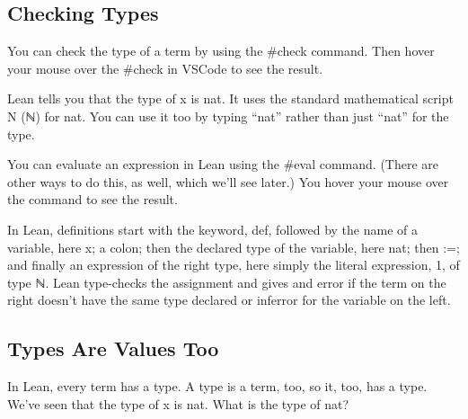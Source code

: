\documentclass[letterpaper,10pt,english]{sphinxmanual}
\begin{document}
\subsection{Checking Types}
\label{\detokenize{15-proofs:checking-types}}
You can check the type of a term by using the \#check command. Then
hover your mouse over the \#check in VSCode to see the result.

\begin{sphinxVerbatim}[commandchars=\\\{\}]
 
 
\end{sphinxVerbatim}

Lean tells you that the type of x is nat.  It uses the standard
mathematical script N (ℕ) for nat. You can use it too by typing “nat”
rather than just “nat” for the type.

\begin{sphinxVerbatim}[commandchars=\\\{\}]
    
\end{sphinxVerbatim}

You can evaluate an expression in Lean using the \#eval command. (There
are other ways to do this, as well, which we’ll see later.) You hover
your mouse over the command to see the result.

\begin{sphinxVerbatim}[commandchars=\\\{\}]
 
\end{sphinxVerbatim}

In Lean, definitions start with the keyword, def, followed by the name
of a variable, here x; a colon; then the declared type of the
variable, here nat; then :=; and finally an expression of the right
type, here simply the literal expression, 1, of type ℕ. Lean
type-checks the assignment and gives and error if the term on the
right doesn’t have the same type declared or inferror for the variable
on the left.


\subsection{Types Are Values Too}
\label{\detokenize{15-proofs:types-are-values-too}}
In Lean, every term has a type. A type is a term, too, so it, too, has
a type. We’ve seen that the type of x is nat. What is the type of nat?
\end{document}
